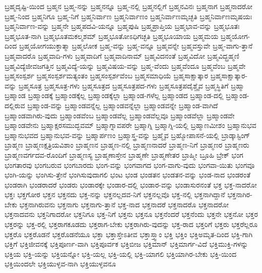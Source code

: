 {ಬ್ರಹ್ಮದೃಷ್ಟಿ-ಯಿಂದ
ಬ್ರಹ್ಮನ
ಬ್ರಹ್ಮ-ನನ್ನು
ಬ್ರಹ್ಮನನ್ನೂ
ಬ್ರಹ್ಮ-ನಲ್ಲಿ
ಬ್ರಹ್ಮನಲ್ಲಿಗೆ
ಬ್ರಹ್ಮನವಿನಃ
ಬ್ರಹ್ಮನಾಗ
ಬ್ರಹ್ಮನಾದರೋ
ಬ್ರಹ್ಮ-ನಿಂದ
ಬ್ರಹ್ಮನಿಗೂ
ಬ್ರಹ್ಮ-ನಿಗೆ
ಬ್ರಹ್ಮನಿರ್ವಾಣ
ಬ್ರಹ್ಮನಿರ್ವಾಣಂ
ಬ್ರಹ್ಮನಿರ್ವಾಣಮೃಚ್ಛತಿ
ಬ್ರಹ್ಮನಿರ್ವಾಣಮೃಷಯಃ
ಬ್ರಹ್ಮನಿರ್ವಾಣ-ವನ್ನು
ಬ್ರಹ್ಮನೇ
ಬ್ರಹ್ಮಪದವಿ-ಯನ್ನೂ
ಬ್ರಹ್ಮಪುಷಿ
ಬ್ರಹ್ಮಪ್ರಾಪ್ತಿಯ
ಬ್ರಹ್ಮಭಾವ-ವನ್ನು
ಬ್ರಹ್ಮಭೂತಃ
ಬ್ರಹ್ಮಭೂತ-ನಾಗಿ
ಬ್ರಹ್ಮಭೂತಮಕಲ್ಮಶಮ್
ಬ್ರಹ್ಮಭೂತೋಽಧಿಗಚ್ಛತಿ
ಬ್ರಹ್ಮಭೂಯಾಯ
ಬ್ರಹ್ಮಮಯ
ಬ್ರಹ್ಮಯೋಗ-ದಿಂದ
ಬ್ರಹ್ಮಯೋಗಯುಕ್ತಾತ್ಮಾ
ಬ್ರಹ್ಮಲೋಕ
ಬ್ರಹ್ಮ-ವನ್ನು
ಬ್ರಹ್ಮ-ವನ್ನೂ
ಬ್ರಹ್ಮವನ್ನೇ
ಬ್ರಹ್ಮವಸ್ತುವೇ
ಬ್ರಹ್ಮ-ವಾಗು-ತ್ತಾನೆ
ಬ್ರಹ್ಮವಾದರೊ
ಬ್ರಹ್ಮವಾದಿ-ಗಳು
ಬ್ರಹ್ಮವಾದಿಗೆ
ಬ್ರಹ್ಮವಾದಿನಾಮ್
ಬ್ರಹ್ಮವಿದನಂತೆ
ಬ್ರಹ್ಮವಿದೋ
ಬ್ರಹ್ಮವಿದ್ಬ್ರಹ್ಮಣಿ
ಬ್ರಹ್ಮವಿದ್ಯೆಜೀವಜಗತ್ತಿನ
ಬ್ರಹ್ಮವಿದ್ಯೆ-ಯನ್ನು
ಬ್ರಹ್ಮವಿಷಯ-ವನ್ನು
ಬ್ರಹ್ಮ-ವೆಂದು
ಬ್ರಹ್ಮವೆಂದೂ
ಬ್ರಹ್ಮವೆಂಬ
ಬ್ರಹ್ಮವೇ
ಬ್ರಹ್ಮಸಂಸ್ಪರ್ಶ
ಬ್ರಹ್ಮಸಂಸ್ಪರ್ಶಮತ್ಯಂತಂ
ಬ್ರಹ್ಮಸಂಸ್ಪರ್ಶವೆಂಬ
ಬ್ರಹ್ಮಸಮಾಧಿಯೆ
ಬ್ರಹ್ಮಸಾಕ್ಷಾತ್ಕಾರ
ಬ್ರಹ್ಮಸಾಕ್ಷಾತ್ಕಾರ-ವನ್ನು
ಬ್ರಹ್ಮಸೂತ್ರ
ಬ್ರಹ್ಮಸೂತ್ರ-ಗಳು
ಬ್ರಹ್ಮಸೂತ್ರದ
ಬ್ರಹ್ಮಸೂತ್ರಪದ-ಗಳು
ಬ್ರಹ್ಮಸೂತ್ರಪದೈಶ್ಚೈವ
ಬ್ರಹ್ಮಸ್ಥಿತಿಗೆ
ಬ್ರಹ್ಮಾ
ಬ್ರಹ್ಮಾಂಡ
ಬ್ರಹ್ಮಾಂಡಕ್ಕೆ
ಬ್ರಹ್ಮಾಂಡಕ್ಕೆಲ್ಲ
ಬ್ರಹ್ಮಾಂಡಕ್ಕೆಲ್ಲಾ
ಬ್ರಹ್ಮಾಂಡ-ಗಳೆಲ್ಲ
ಬ್ರಹ್ಮಾಂಡದ
ಬ್ರಹ್ಮಾಂಡ-ದಲ್ಲಿ
ಬ್ರಹ್ಮಾಂಡ-ದಲ್ಲಿರುವ
ಬ್ರಹ್ಮಾಂಡ-ವನ್ನು
ಬ್ರಹ್ಮಾಂಡವನ್ನೆಲ್ಲ
ಬ್ರಹ್ಮಾಂಡವನ್ನೆಲ್ಲಾ
ಬ್ರಹ್ಮಾಂಡವನ್ನೇ
ಬ್ರಹ್ಮಾಂಡ-ವಾಗಿದೆ
ಬ್ರಹ್ಮಾಂಡವಾಗಿರು-ವುದು
ಬ್ರಹ್ಮಾಂಡವೆಂಬ
ಬ್ರಹ್ಮಾಂಡವೆಲ್ಲ
ಬ್ರಹ್ಮಾಂಡವೆಲ್ಲವೂ
ಬ್ರಹ್ಮಾಂಡವೆಲ್ಲಾ
ಬ್ರಹ್ಮಾಂಡವೇ
ಬ್ರಹ್ಮಾಂಡವೇನು
ಬ್ರಹ್ಮಾಕ್ಷರಸಮುದ್ಭವಮ್
ಬ್ರಹ್ಮಾಗ್ನಾವಪರೇ
ಬ್ರಹ್ಮಾಗ್ನಿ
ಬ್ರಹ್ಮಾಗ್ನಿ-ಯಲ್ಲಿ
ಬ್ರಹ್ಮಾಣಮೀಶಂ
ಬ್ರಹ್ಮಾನುಭವ
ಬ್ರಹ್ಮಾನುಭವದ
ಬ್ರಹ್ಮಾನುಭವ-ವನ್ನು
ಬ್ರಹ್ಮಾರ್ಪಣಂ
ಬ್ರಹ್ಮಾಸ್ತ್ರ-ವನ್ನು
ಬ್ರಹ್ಮೈವ
ಬ್ರಹ್ಮೋಪಾಸನೆ-ಯಲ್ಲಿ
ಬ್ರಾಡ್ಕಾಸ್ಟಿಂಗ್
ಬ್ರಾಹ್ಮಣ
ಬ್ರಾಹ್ಮಣಕ್ಷತ್ರಿಯವಿಶಾಂ
ಬ್ರಾಹ್ಮಣನ
ಬ್ರಾಹ್ಮಣ-ನಲ್ಲಿ
ಬ್ರಾಹ್ಮಣನಾದರೆ
ಬ್ರಾಹ್ಮಣ-ನಿಗೆ
ಬ್ರಾಹ್ಮಣರ
ಬ್ರಾಹ್ಮಣರು
ಬ್ರಾಹ್ಮಣವರ್ಗದವ-ರೊಂದಿಗೆ
ಬ್ರಾಹ್ಮಣಸ್ಯ
ಬ್ರಾಹ್ಮಣಾಸ್ತೇನ
ಬ್ರಾಹ್ಮಣೇ
ಬ್ರಾಹ್ಮಣೇತರ
ಬ್ರಾಹ್ಮೀ
ಬ್ರೂಹಿ
ಬ್ರೇಕ್
ಭಂಗ
ಭಂಗತಾರವು
ಭಂಗಬರುವ
ಭಂಗಬಾರದು
ಭಂಗ-ವನ್ನು
ಭಂಗವಾಗದ
ಭಂಗ-ವಾಗು-ವುದು
ಭಂಗವಾ-ಯಿತು
ಭಂಗವೂ
ಭಂಗಿ-ಯನ್ನು
ಭಂಗಿಸು-ತ್ತೇನೆ
ಭಂಗಿಸುವುದಾಗಲಿ
ಭಂಟ
ಭಂಡ
ಭಂಡತನ
ಭಂಡತನ-ವನ್ನು
ಭಂಡ-ನಾದ
ಭಂಡರಂತೆ
ಭಂಡರಾಗಿ
ಭಂಡರಾದರೆ
ಭಂಡರು
ಭಂಡಾರಕ್ಕೇ
ಭಂಡಾರ-ದಲ್ಲಿ
ಭಂಡಾರ-ವನ್ನು
ಭಂಡಾಸುರನಂತೆ
ಭಕ್ತ
ಭಕ್ತ-ನಾದರೋ
ಭಕ್ತಃ
ಭಕ್ತಗೋರ
ಭಕ್ತನ
ಭಕ್ತನದು
ಭಕ್ತ-ನನ್ನು
ಭಕ್ತನಲ್ಲದವ-ನಿಗೆ
ಭಕ್ತನಲ್ಲವೊ
ಭಕ್ತ-ನಲ್ಲಿ
ಭಕ್ತನಾಗಿದ್ದಾನೆ
ಭಕ್ತನಾಗಿರ-ಬೇಕು
ಭಕ್ತನಾಗಿರುವನು
ಭಕ್ತನಾಗು
ಭಕ್ತನಾಗು-ತ್ತಾನೆ
ಭಕ್ತ-ನಾದ
ಭಕ್ತನಾದರೆ
ಭಕ್ತನಾದರೊ
ಭಕ್ತನಾದರೋ
ಭಕ್ತನಾದವನು
ಭಕ್ತನಿಗಾದರೋ
ಭಕ್ತನಿಗೂ
ಭಕ್ತ-ನಿಗೆ
ಭಕ್ತನು
ಭಕ್ತನೂ
ಭಕ್ತನೆಂದರೆ
ಭಕ್ತನೆಂದು
ಭಕ್ತನೇ
ಭಕ್ತನೋ
ಭಕ್ತರ
ಭಕ್ತರನ್ನು
ಭಕ್ತ-ರಲ್ಲಿ
ಭಕ್ತರಾಗಕೂಡದು
ಭಕ್ತರಾಗ-ಬೇಕು
ಭಕ್ತರಾಗಿರು-ವುದನ್ನು
ಭಕ್ತ-ರಾದ
ಭಕ್ತರಿಗೆ
ಭಕ್ತರು
ಭಕ್ತರೆಲ್ಲರೂ
ಭಕ್ತರೊ
ಭಕ್ತರೊಡನೆ
ಭಕ್ತರೊಡನೆಯೂ
ಭಕ್ತಾ
ಭಕ್ತಾಸ್ತೇಽತೀವ
ಭಕ್ತಾಸ್ತ್ವಾಂ
ಭಕ್ತಿ
ಭಕ್ತಿಂ
ಭಕ್ತಿಅಮೃತ-ದಿಂದ
ಭಕ್ತಿ-ಗಾಗಿ
ಭಕ್ತಿಗೆ
ಭಕ್ತಿಜೀವನಕ್ಕೆ
ಭಕ್ತಿಪೂರ್ಣ-ವಾಗಿ
ಭಕ್ತಿಪೂರ್ವಕ
ಭಕ್ತಿಬೀಜ
ಭಕ್ತಿಮಾನ್
ಭಕ್ತಿಮಾರ್ಗ-ವಿದೆ
ಭಕ್ತಿಮುಕ್ತಿ-ಗಳನ್ನು
ಭಕ್ತಿಯ
ಭಕ್ತಿ-ಯನ್ನು
ಭಕ್ತಿಯನ್ನೋ
ಭಕ್ತಿ-ಯಲ್ಲ
ಭಕ್ತಿ-ಯಲ್ಲಿ
ಭಕ್ತಿ-ಯಾಗಲಿ
ಭಕ್ತಿಯಾಗಿರ-ಬೇಕು
ಭಕ್ತಿ-ಯಿಂದ
ಭಕ್ತಿಯಿಂದಲೇ
ಭಕ್ತಿಯುಳ್ಳವ-ನಾಗಿ
ಭಕ್ತಿಯುಳ್ಳವನೂ
}
